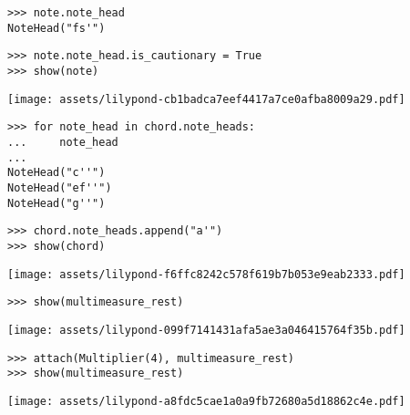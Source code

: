 \begin{comment}
<abjad>
note.note_head
note.note_head.is_cautionary = True
show(note)
</abjad>
\end{comment}

\begin{abjadbookoutput}
\begin{singlespacing}
\vspace{-0.5\baselineskip}
\begin{lstlisting}
>>> note.note_head
NoteHead("fs'")
\end{lstlisting}
\begin{lstlisting}
>>> note.note_head.is_cautionary = True
>>> show(note)
\end{lstlisting}
\noindent\texttt{[image: assets/lilypond-cb1badca7eef4417a7ce0afba8009a29.pdf]}
\end{singlespacing}
\end{abjadbookoutput}

\begin{comment}
<abjad>
for note_head in chord.note_heads:
    note_head

chord.note_heads.append("a'")
show(chord)
</abjad>
\end{comment}

\begin{abjadbookoutput}
\begin{singlespacing}
\vspace{-0.5\baselineskip}
\begin{lstlisting}
>>> for note_head in chord.note_heads:
...     note_head
...
NoteHead("c''")
NoteHead("ef''")
NoteHead("g''")
\end{lstlisting}
\begin{lstlisting}
>>> chord.note_heads.append("a'")
>>> show(chord)
\end{lstlisting}
\noindent\texttt{[image: assets/lilypond-f6ffc8242c578f619b7b053e9eab2333.pdf]}
\end{singlespacing}
\end{abjadbookoutput}

\begin{comment}
<abjad>
show(multimeasure_rest)
attach(Multiplier(4), multimeasure_rest)
show(multimeasure_rest)
</abjad>
\end{comment}

\begin{abjadbookoutput}
\begin{singlespacing}
\vspace{-0.5\baselineskip}
\begin{lstlisting}
>>> show(multimeasure_rest)
\end{lstlisting}
\noindent\texttt{[image: assets/lilypond-099f7141431afa5ae3a046415764f35b.pdf]}
\begin{lstlisting}
>>> attach(Multiplier(4), multimeasure_rest)
>>> show(multimeasure_rest)
\end{lstlisting}
\noindent\texttt{[image: assets/lilypond-a8fdc5cae1a0a9fb72680a5d18862c4e.pdf]}
\end{singlespacing}
\end{abjadbookoutput}

